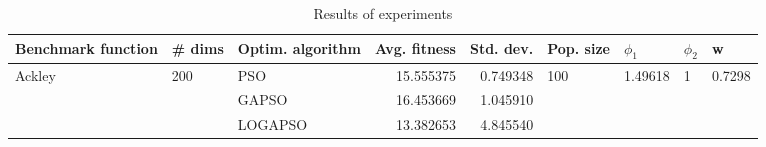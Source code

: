 \begin{table}
\centering
\caption{Results of experiments}
\begin{tabular}{lllrrllll}
\toprule
     Benchmark function &              \# dims & Optim. algorithm &  Avg. fitness &  Std. dev. &            Pop. size &               $\phi_{1}$ &         $\phi_{2}$ &                       w \\
\midrule
\multirow{3}{*}{Ackley} & \multirow{3}{*}{200} &              PSO &     15.555375 &   0.749348 & \multirow{3}{*}{100} & \multirow{3}{*}{1.49618} & \multirow{3}{*}{1} & \multirow{3}{*}{0.7298} \\
                        &                      &            GAPSO &     16.453669 &   1.045910 &                      &                          &                    &                         \\
                        &                      &          LOGAPSO &     13.382653 &   4.845540 &                      &                          &                    &                         \\
\bottomrule
\end{tabular}
\end{table}
